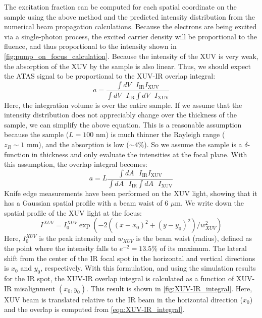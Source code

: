 The excitation fraction can be computed for each spatial coordinate on the sample using the above method and the predicted intensity distribution from the numerical beam propagation calculations. Because the electrons are being excited via a single-photon process, the excited carrier density will be proportional to the fluence, and thus proportional to the intensity shown in \cref{fig:pump_on_focus_calculation}. Because the intensity of the XUV is very weak, the absorption of the XUV by the sample is also linear. Thus, we should expect the ATAS signal to be proportional to the XUV-IR overlap integral:
\begin{equation}
a = \frac{ \int dV \text{ } I_{\text{IR}} I_{\text{XUV}} }{ \int dV \text{ } I_{\text{IR}} \int dV \text{ } I_{\text{XUV}} }
\label{eqn:XUV-IR_integral_volume}
\end{equation}
Here, the integration volume is over the entire sample. If we assume that the intensity distribution does not appreciably change over the thickness of the sample, we can simplify the above equation. This is a reasonable assumption because the sample ($L = 100 \text{ nm}$) is much thinner the Rayleigh range ($z_R \sim 1 \text{ mm}$), and the absorption is low ($\sim 4\%$). So we assume the sample is a $\delta$-function in thickness and only evaluate the intensities at the focal plane. With this assumption, the overlap integral becomes:
\begin{equation}
a = L \frac{ \int dA \text{ } I_{\text{IR}} I_{\text{XUV}} }{ \int dA \text{ } I_{\text{IR}} \int dA \text{ } I_{\text{XUV}} }
\label{eqn:XUV-IR_integral}
\end{equation}
Knife edge measurements have been performed on the XUV light, showing that it has a Gaussian spatial profile with a beam waist of 6 $\mu$m. We write down the spatial profile of the XUV light at the focus:
\begin{equation}
I^{XUV} = I_0^{XUV} \exp \left( - 2 ((x-x_0)^2 + (y-y_0)^2) /  w_{XUV}^2 \right)
\end{equation}
Here, $I_0^{XUV}$ is the peak intensity and $w_{XUV}$ is the beam waist (radius), defined as the point where the intensity falls to $e^{-2} = 13.5\%$ of its maximum. The lateral shift from the center of the IR focal spot in the horizontal and vertical directions is $x_0$ and $y_0$, respectively. With this formulation, and using the simulation results for the IR spot, the XUV-IR overlap integral is calculated as a function of XUV-IR misalignment $(x_0, y_0)$. This result is shown in \cref{fig:XUV-IR_integral}. Here, XUV beam is translated relative to the IR beam in the horizontal direction ($x_0$) and the overlap is computed from \cref{eqn:XUV-IR_integral}.

